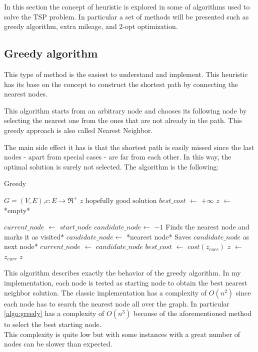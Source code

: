 In this section the concept of heuristic is explored in some of algorithms used to solve the TSP problem. In particular a set of methods will be presented such as greedy algorithm, extra mileage, and 2-opt optimization.

\subsection{Greedy algorithm}
\label{sec:greedy}
This type of method is the easiest to understand and implement. This heuristic has its base on the concept to construct the shortest path by connecting the nearest nodes.

This algorithm starts from an arbitrary node and chooses its following node by selecting the nearest one from the ones that are not already in the path. This greedy approach is also called Nearest Neighbor.

The main side effect it has is that the shortest path is easily missed since the last nodes - apart from special cases - are far from each other. In this way, the optimal solution is surely not selected. The algorithm is the following: 

\begin{algorithm}
	\caption{Greedy}\label{algo:greedy}
	\begin{algorithmic}[1]
		\Require $G=(V,E)$,$ c:E\rightarrow \Re^+$
		\Ensure $z\text{ hopefully good solution}$
		\State $best\_cost$ $\gets$ $+\infty$
		\State $z$ $\gets$ *empty*
		
			\State $current\_node$ $\gets$ $start\_node$
			\State $candidate\_node \gets$ $-1$
					\State *Finds the nearest node and marks it as visited*
					\State $candidate\_node \gets$ *nearest node*
				\EndFor
				\State *Saves $candidate\_node$ as next node*
				\State $current\_node$ $\gets$ $candidate\_node$
			\EndWhile
				\State $best\_cost$ $\gets$ $cost(z_{curr})$
				\State $z$ $\gets$ $z_{curr}$
			\EndIf
		\EndFor
		\State \Return $z$
	\end{algorithmic}
\end{algorithm}

This algorithm describes exactly the behavior of the greedy algorithm. In my implementation, each node is tested as starting node to obtain the best nearest neighbor solution. The classic implementation has a complexity of $O(n^2)$ since each node has to search the nearest node all over the graph. In particular \ref{algo:greedy} has a complexity of $O(n^3)$ because of the aforementioned method to select the best starting node.\\
This complexity is quite low but with some instances with a great number of nodes can be slower than expected.

